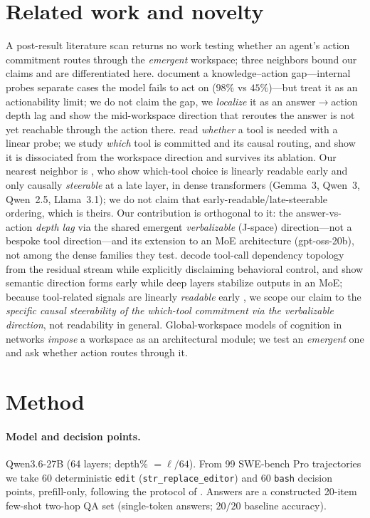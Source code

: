 \documentclass[11pt]{article}
\begin{document}
\section{Related work and novelty}\label{sec:related}
A post-result literature scan returns no work testing whether an agent's action commitment routes
through the \emph{emergent} workspace; three neighbors bound our claims and are differentiated here.
\citet{basu2026gap} document a knowledge--action gap---internal probes separate cases the model
fails to act on ($98\%$ vs $45\%$)---but treat it as an actionability limit; we do not claim the gap,
we \emph{localize} it as an answer$\rightarrow$action depth lag and show the mid-workspace direction
that reroutes the answer is not yet reachable through the action there. \citet{when2tool2026} read \emph{whether} a tool
is needed with a linear probe; we study \emph{which} tool is committed and its causal routing, and
show it is dissociated from the workspace direction and survives its ablation. Our nearest neighbor
is \citet{toolsteer2026}, who show which-tool choice is linearly readable early and only causally
\emph{steerable} at a late layer, in dense transformers (Gemma~3, Qwen~3, Qwen~2.5, Llama~3.1); we do
not claim that early-readable/late-steerable ordering, which is theirs. Our contribution is orthogonal
to it: the answer-vs-action \emph{depth lag} via the shared emergent \emph{verbalizable} (J-space)
direction---not a bespoke tool direction---and its extension to an MoE architecture (gpt-oss-20b), not
among the dense families they test. \citet{tooldep2026} decode tool-call dependency topology from the
residual stream while explicitly disclaiming behavioral control, and \citet{planning2026} show
semantic direction forms early while deep layers stabilize outputs in an MoE; because tool-related
signals are linearly \emph{readable} early \citep{toolsteer2026,tooldep2026}, we scope our claim to the
\emph{specific causal steerability of the which-tool commitment via the verbalizable direction}, not
readability in general. Global-workspace models of cognition in networks
\citep{goyal2021gwt,vanrullen2021gwt} \emph{impose} a workspace as an architectural module; we test an
\emph{emergent} one and ask whether action routes through it.

\section{Method}\label{sec:method}
\paragraph{Model and decision points.} Qwen3.6-27B (64 layers; depth\% $= \ell/64$). From 99
SWE-bench Pro trajectories \citep{vicentino2026brake} we take 60 deterministic \texttt{edit}
(\texttt{str\_replace\_editor}) and 60 \texttt{bash} decision points, prefill-only, following the
protocol of \citet{vicentino2026lever}. Answers are a constructed 20-item few-shot two-hop QA set
(single-token answers; $20/20$ baseline accuracy).
\end{document}
